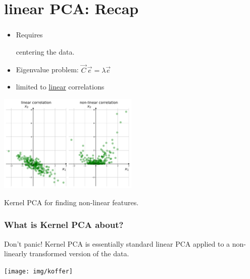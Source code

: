
\section{linear PCA: Recap}

\begin{frame}\frametitle{\secname}
\begin{itemize}
\item Requires \pause

 centering the data.

\pause
 
\item Eigenvalue problem: $\vec C\,\vec e = \lambda \vec e$
\item limited to \underline{linear} correlations
\end{itemize}


\begin{center}
	\includegraphics[width=0.5\textwidth]{img/scatter}%
\end{center}

Kernel PCA for finding non-linear features.\\


\end{frame}

\begin{frame}\frametitle{What is Kernel PCA about?}

Don't panic! Kernel PCA is essentially standard linear PCA applied to a non-linearly transformed version of the data.

\begin{center}
	\texttt{[image: img/koffer]}%
\end{center}

\end{frame}
